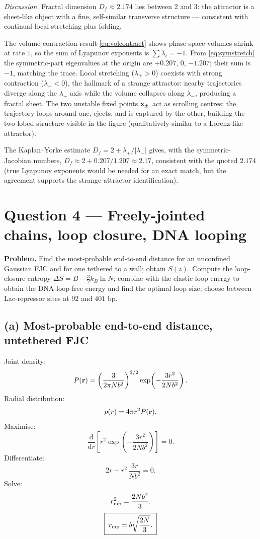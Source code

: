 \documentclass[11pt]{article}
\newcommand{\de}{\mathrm{d}}
\begin{document}
\textit{Discussion.} Fractal dimension $D_f\approx 2.174$ lies between 2 and 3: the attractor is a sheet-like object with a fine, self-similar transverse structure --- consistent with continual local stretching plus folding.

The volume-contraction result \eqref{eq:volcontract} shows phase-space volumes shrink at rate $1$, so the sum of Lyapunov exponents is $\sum\lambda_i = -1$. From \eqref{eq:symstretch} the symmetric-part eigenvalues at the origin are $+0.207$, $0$, $-1.207$; their sum is $-1$, matching the trace. Local stretching ($\lambda_+>0$) coexists with strong contraction ($\lambda_-<0$), the hallmark of a strange attractor: nearby trajectories diverge along the $\lambda_+$ axis while the volume collapses along $\lambda_-$, producing a fractal sheet. The two unstable fixed points $\vb x_\pm$ act as scrolling centres: the trajectory loops around one, ejects, and is captured by the other, building the two-lobed structure visible in the figure (qualitatively similar to a Lorenz-like attractor).

The Kaplan--Yorke estimate $D_f = 2 + \lambda_+/|\lambda_-|$ gives, with the symmetric-Jacobian numbers, $D_f \approx 2 + 0.207/1.207 \approx 2.17$, consistent with the quoted $2.174$ (true Lyapunov exponents would be needed for an exact match, but the agreement supports the strange-attractor identification).

\section*{Question 4 --- Freely-jointed chains, loop closure, DNA looping}

\textbf{Problem.} Find the most-probable end-to-end distance for an unconfined Gaussian FJC and for one tethered to a wall; obtain $S(z)$. Compute the loop-closure entropy $\Delta S = B - \tfrac32 k_B\ln N$; combine with the elastic loop energy to obtain the DNA loop free energy and find the optimal loop size; choose between Lac-repressor sites at $92$ and $401$ bp.

\subsection*{(a) Most-probable end-to-end distance, untethered FJC}

Joint density:
\[ P(\vb r) = \left(\frac{3}{2\pi N b^2}\right)^{3/2}\exp\!\left(-\frac{3 r^2}{2N b^2}\right). \]
Radial distribution:
\[ p(r) = 4\pi r^2 P(\vb r). \]
Maximise:
\[ \frac{\de}{\de r}\!\left[r^2\exp\!\left(-\frac{3r^2}{2Nb^2}\right)\right] = 0. \]
Differentiate:
\[ 2r - r^2\,\frac{3r}{Nb^2} = 0. \]
Solve:
\[ r_{\rm mp}^2 = \frac{2Nb^2}{3}. \]
\begin{equation}
\boxed{\;r_{\rm mp} = b\sqrt{\frac{2N}{3}}.\;}
\label{eq:rmpfree}
\end{equation}
\end{document}
